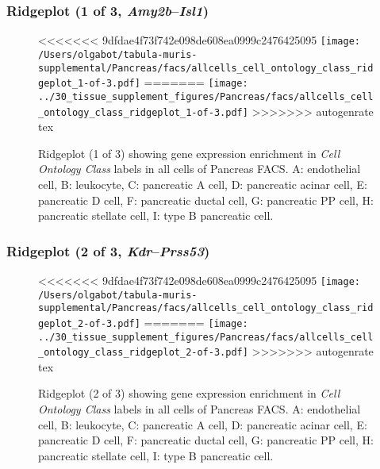 \clearpage

\subsubsection{Ridgeplot (1 of 3, \emph{Amy2b}--\emph{Isl1})}
\begin{figure}[h]
\centering
<<<<<<< 9dfdae4f73f742e098de608ea0999c2476425095
\texttt{[image: /Users/olgabot/tabula-muris-supplemental/Pancreas/facs/allcells\_cell\_ontology\_class\_ridgeplot\_1-of-3.pdf]}
=======
\texttt{[image: ../30\_tissue\_supplement\_figures/Pancreas/facs/allcells\_cell\_ontology\_class\_ridgeplot\_1-of-3.pdf]}
>>>>>>> autogenrate tex

\caption{ Ridgeplot (1 of 3)  showing gene expression enrichment in \emph{Cell Ontology Class} labels in all cells of Pancreas FACS. A: endothelial cell, B: leukocyte, C: pancreatic A cell, D: pancreatic acinar cell, E: pancreatic D cell, F: pancreatic ductal cell, G: pancreatic PP cell, H: pancreatic stellate cell, I: type B pancreatic cell.}
\end{figure}


\clearpage

\subsubsection{Ridgeplot (2 of 3, \emph{Kdr}--\emph{Prss53})}
\begin{figure}[h]
\centering
<<<<<<< 9dfdae4f73f742e098de608ea0999c2476425095
\texttt{[image: /Users/olgabot/tabula-muris-supplemental/Pancreas/facs/allcells\_cell\_ontology\_class\_ridgeplot\_2-of-3.pdf]}
=======
\texttt{[image: ../30\_tissue\_supplement\_figures/Pancreas/facs/allcells\_cell\_ontology\_class\_ridgeplot\_2-of-3.pdf]}
>>>>>>> autogenrate tex

\caption{ Ridgeplot (2 of 3)  showing gene expression enrichment in \emph{Cell Ontology Class} labels in all cells of Pancreas FACS. A: endothelial cell, B: leukocyte, C: pancreatic A cell, D: pancreatic acinar cell, E: pancreatic D cell, F: pancreatic ductal cell, G: pancreatic PP cell, H: pancreatic stellate cell, I: type B pancreatic cell.}
\end{figure}


\clearpage

